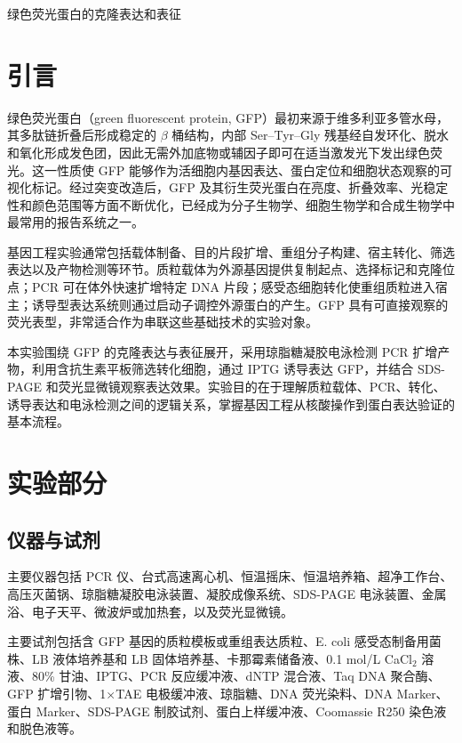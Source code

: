 \documentclass[a4paper]{article}
\newcommand{\zihaoSan}{\fontsize{16pt}{24pt}\selectfont}
\newcommand{\zihaoWu}{\fontsize{10.5pt}{16pt}\selectfont}
\begin{document}
\zihaoWu

\begin{center}
	{\zihaoSan\heiti 绿色荧光蛋白的克隆表达和表征}
\end{center}

\vspace{6pt}

\section{引言}
\vspace{-0.5em}

绿色荧光蛋白（green fluorescent protein, GFP）最初来源于维多利亚多管水母，其多肽链折叠后形成稳定的 $\beta$ 桶结构，内部 Ser--Tyr--Gly 残基经自发环化、脱水和氧化形成发色团，因此无需外加底物或辅因子即可在适当激发光下发出绿色荧光\cite{chalfie1994,tsien1998}。这一性质使 GFP 能够作为活细胞内基因表达、蛋白定位和细胞状态观察的可视化标记。经过突变改造后，GFP 及其衍生荧光蛋白在亮度、折叠效率、光稳定性和颜色范围等方面不断优化，已经成为分子生物学、细胞生物学和合成生物学中最常用的报告系统之一。

基因工程实验通常包括载体制备、目的片段扩增、重组分子构建、宿主转化、筛选表达以及产物检测等环节。质粒载体为外源基因提供复制起点、选择标记和克隆位点；PCR 可在体外快速扩增特定 DNA 片段；感受态细胞转化使重组质粒进入宿主；诱导型表达系统则通过启动子调控外源蛋白的产生。GFP 具有可直接观察的荧光表型，非常适合作为串联这些基础技术的实验对象。

本实验围绕 GFP 的克隆表达与表征展开，采用琼脂糖凝胶电泳检测 PCR 扩增产物，利用含抗生素平板筛选转化细胞，通过 IPTG 诱导表达 GFP，并结合 SDS-PAGE 和荧光显微镜观察表达效果。实验目的在于理解质粒载体、PCR、转化、诱导表达和电泳检测之间的逻辑关系，掌握基因工程从核酸操作到蛋白表达验证的基本流程。

\section{实验部分}
\vspace{-0.5em}

\subsection{仪器与试剂}

主要仪器包括 PCR 仪、台式高速离心机、恒温摇床、恒温培养箱、超净工作台、高压灭菌锅、琼脂糖凝胶电泳装置、凝胶成像系统、SDS-PAGE 电泳装置、金属浴、电子天平、微波炉或加热套，以及荧光显微镜。

主要试剂包括含 GFP 基因的质粒模板或重组表达质粒、E. coli 感受态制备用菌株、LB 液体培养基和 LB 固体培养基、卡那霉素储备液、0.1 mol/L CaCl$_2$ 溶液、80\% 甘油、IPTG、PCR 反应缓冲液、dNTP 混合液、Taq DNA 聚合酶、GFP 扩增引物、1$\times$TAE 电极缓冲液、琼脂糖、DNA 荧光染料、DNA Marker、蛋白 Marker、SDS-PAGE 制胶试剂、蛋白上样缓冲液、Coomassie R250 染色液和脱色液等。
\end{document}
